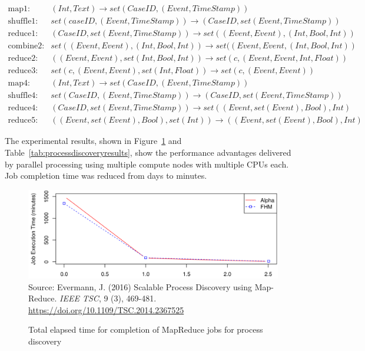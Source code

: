 \footnotesize
\begin{align*}
\text{map1:} &(Int, Text) \rightarrow set(CaseID, (Event, TimeStamp)) \\
\text{shuffle1:} &set(caseID, (Event, TimeStamp)) \rightarrow (CaseID, set(Event, TimeStamp)) \\
\text{reduce1:}  &(CaseID, set(Event, TimeStamp)) \rightarrow set((Event, Event), (Int, Bool, Int)) \\
\text{combine2:} &set((Event, Event), (Int, Bool, Int)) \rightarrow set((Event, Event, (Int, Bool, Int)) \\
\text{reduce2:}   &((Event, Event), set(Int, Bool, Int)) \rightarrow set(c, (Event, Event, Int, Float)) \\
\text{reduce3:}  & set(c, (Event, Event), set(Int, Float)) \rightarrow set(c, (Event, Event)) \\
\text{map4:}     & (Int, Text) \rightarrow set(CaseID, (Event, TimeStamp)) \\
\text{shuffle4:} & set(CaseID, (Event, TimeStamp)) \rightarrow (CaseID, set(Event, TimeStamp)) \\
\text{reduce4:}  & (CaseID, set(Event, TimeStamp)) \rightarrow set((Event, set(Event), Bool), Int) \\
\text{reduce5:}  & ((Event, set(Event), Bool), set(Int)) \rightarrow ((Event, set(Event), Bool), Int) 
\end{align*}
\normalsize

The experimental results, shown in Figure~\ref{fig:processdiscoveryresults} and Table~\ref{tab:processdiscoveryresults}, show the performance advantages delivered by parallel processing using multiple compute nodes with multiple CPUs each. Job completion time was reduced from days to minutes. 

\begin{figure}
\centering

\includegraphics[width=.9\textwidth]{screen2.png} \\

\scriptsize
Source: Evermann, J. (2016) Scalable Process Discovery using Map-Reduce. \emph{IEEE TSC}, 9 (3), 469-481. \footnotesize \url{https://doi.org/10.1109/TSC.2014.2367525}
\caption[MapReduce performance for process discovery]{Total elapsed time for completion of MapReduce jobs for process discovery}
\label{fig:processdiscoveryresults}
\end{figure}

